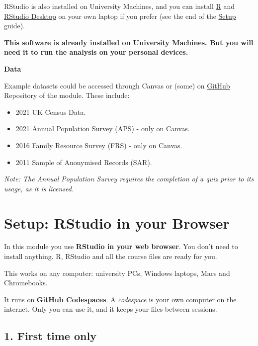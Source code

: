 \documentclass[
  letterpaper,
  DIV=11,
  numbers=noendperiod]{scrreprt}
\providecommand{\tightlist}{%
  \setlength{\itemsep}{0pt}\setlength{\parskip}{0pt}}
\begin{document}
RStudio is also installed on University Machines, and you can install
\href{https://cran.r-project.org/}{R} and
\href{https://posit.co/download/rstudio-desktop/}{RStudio Desktop} on
your own laptop if you prefer (see the end of the
\href{setup.qmd}{Setup} guide).

\textbf{This software is already installed on University Machines. But
you will need it to run the analysis on your personal devices.}

\textbf{Data}

Example datasets could be accessed through Canvas or (some) on
\href{https://github.com/GDSL-UL/stats}{GitHub} Repository of the
module. These include:

\begin{itemize}
\tightlist
\item
  2021 UK Census Data.
\item
  2021 Annual Population Survey (APS) - only on Canvas.
\item
  2016 Family Resource Survey (FRS) - only on Canvas.
\item
  2011 Sample of Anonymised Records (SAR).
\end{itemize}

\emph{Note: The Annual Population Survey requires the completion of a
quiz prior to its usage, as it is licensed.}


\chapter*{Setup: RStudio in your
Browser}\label{setup-rstudio-in-your-browser}


In this module you use \textbf{RStudio in your web browser}. You don't
need to install anything. R, RStudio and all the course files are ready
for you.

This works on any computer: university PCs, Windows laptops, Macs and
Chromebooks.

It runs on \textbf{GitHub Codespaces}. A \emph{codespace} is your own
computer on the internet. Only you can use it, and it keeps your files
between sessions.

\section*{1. First time only}\label{first-time-only}
\end{document}
